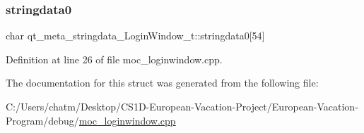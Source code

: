 \mbox{\label{structqt__meta__stringdata___login_window__t_a36283c71f4a6fe995ac444fcdbb22ddb}} 
\subsubsection{\texorpdfstring{stringdata0}{stringdata0}}
{\footnotesize\ttfamily char qt\+\_\+meta\+\_\+stringdata\+\_\+\+Login\+Window\+\_\+t\+::stringdata0\mbox{[}54\mbox{]}}



Definition at line 26 of file moc\+\_\+loginwindow.\+cpp.



The documentation for this struct was generated from the following file\+:\begin{DoxyCompactItemize}
\item 
C\+:/\+Users/chatm/\+Desktop/\+C\+S1\+D-\/\+European-\/\+Vacation-\/\+Project/\+European-\/\+Vacation-\/\+Program/debug/\mbox{\hyperlink{moc__loginwindow_8cpp}{moc\+\_\+loginwindow.\+cpp}}\end{DoxyCompactItemize}
